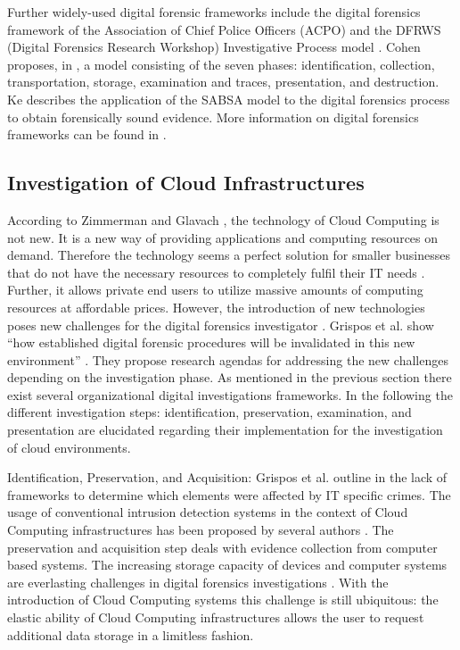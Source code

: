 \documentclass[runningheads,a4paper]{llncs}
\begin{document}
Further widely-used digital forensic frameworks include the digital forensics framework of the Association of Chief Police Officers (ACPO) \cite{acpo-guidelines} and the DFRWS (Digital Forensics Research Workshop) Investigative Process model \cite{Carrier2003}. Cohen proposes, in \cite{Cohen2010}, a model consisting of the seven phases: identification, collection, transportation, storage, examination and traces, presentation, and destruction. Ke \cite{Ke2011} describes the application of the SABSA model to the digital forensics process to obtain forensically sound evidence. More information on digital forensics frameworks can be found in \cite{Pollitt2007}. 

\subsection{Investigation of Cloud Infrastructures}

According to Zimmerman and Glavach \cite{Zimmerman2011}, the technology of Cloud Computing is not new. It is a new way of providing applications and computing resources on demand. Therefore the technology seems a perfect solution for smaller businesses that do not have the necessary resources to completely fulfil their IT needs \cite{Biggs2009,Pollitt2008}. Further, it allows private end users to utilize massive amounts of computing resources at affordable prices. However, the introduction of new technologies poses new challenges for the digital forensics investigator \cite{Wolthusen2009}. Grispos et al. show ``how established digital forensic procedures will be invalidated in this new environment'' \cite{Grispos2011}. They propose research agendas for addressing the new challenges depending on the investigation phase. As mentioned in the previous section there exist several organizational digital investigations frameworks. In the following the different investigation steps: identification, preservation, examination, and presentation are elucidated regarding their implementation for the investigation of cloud environments. 

Identification, Preservation, and Acquisition: Grispos et al. outline in \cite{Grispos2011} the lack of frameworks to determine which elements were affected by IT specific crimes. The usage of conventional intrusion detection systems in the context of Cloud Computing infrastructures has been proposed by several authors \cite{Grispos2011}. The preservation and acquisition step deals with evidence collection from computer based systems. The increasing storage capacity of devices and computer systems are everlasting challenges in digital forensics investigations \cite{Grispos2011}. With the introduction of Cloud Computing systems this challenge is still ubiquitous: the elastic ability of Cloud Computing infrastructures allows the user to request additional data storage in a limitless fashion. 
\end{document}
